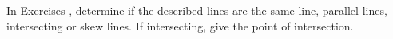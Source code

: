 {\noindent In Exercises}
{, determine if the described lines are the same line, parallel lines, intersecting or skew lines. If intersecting, give the point of intersection.
}
